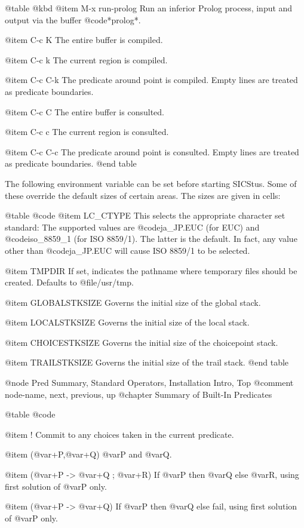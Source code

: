 {{{{{@table @kbd
@item M-x run-prolog
Run an inferior Prolog process, input and output via the buffer
@code{*prolog*}.

@item C-c K
The entire buffer is compiled.

@item C-c k
The current region is compiled.

@item C-c C-k
The predicate around point is compiled.  Empty lines are treated
as predicate boundaries.

@item C-c C
The entire buffer is consulted.

@item C-c c
The current region is consulted.

@item C-c C-c
The predicate around point is consulted.  Empty lines are treated
as predicate boundaries.
@end table

The following environment variable can be set before starting SICStus.
Some of these override the default sizes of certain areas.  The sizes
are given in cells:

@table @code
@item LC_CTYPE
This selects the appropriate character set standard: The supported
values are @code{ja_JP.EUC} (for EUC) and @code{iso_8859_1} (for ISO
8859/1).  The latter is the default.  In fact, any value other than
@code{ja_JP.EUC} will cause ISO 8859/1 to be selected.

@item TMPDIR
If set, indicates the pathname where temporary files should be
created. Defaults to @file{/usr/tmp}.

@item GLOBALSTKSIZE
Governs the initial size of the global stack.

@item LOCALSTKSIZE
Governs the initial size of the local stack.

@item CHOICESTKSIZE
Governs the initial size of the choicepoint stack.

@item TRAILSTKSIZE
Governs the initial size of the trail stack.
@end table

@node Pred Summary, Standard Operators, Installation Intro, Top
@comment  node-name,  next,  previous,  up
@chapter Summary of Built-In Predicates

@table @code

@item !
Commit to any choices taken in the current predicate.

@item (@var{+P},@var{+Q})
@var{P} and @var{Q}.

@item (@var{+P} -> @var{+Q} ; @var{+R})
If @var{P} then @var{Q} else @var{R}, using first solution of @var{P} only.

@item (@var{+P} -> @var{+Q})
If @var{P} then @var{Q} else fail, using first solution of @var{P} only.

}}}}}
